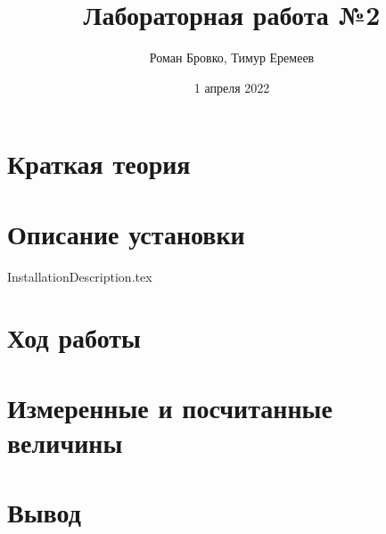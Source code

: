 \documentclass[a4paper, 12pt]{article}
\begin{document}
    \title{Лабораторная работа №2}
    \author{Роман Бровко, Тимур Еремеев}
    \date{1 апреля 2022}

    \maketitle

    

    \section*{Краткая теория}
    

    \section*{Описание установки}
     {InstallationDescription.tex}

    \section*{Ход работы}
    

    \section*{Измеренные и посчитанные величины}
    

    \section*{Вывод}
    
\end{document}
